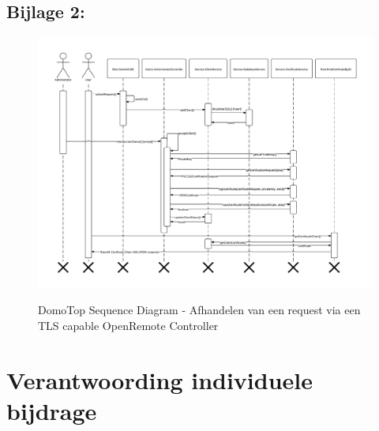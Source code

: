 \documentclass[]{article}
\begin{document}
\begin{landscape}
\subsection{Bijlage 2: }
\begin{figure}[h!]
  \centering
    \includegraphics[height=0.80\textheight,keepaspectratio]{DomoTopSequenceDiagram_without_title.pdf}
  \label{fig:tls}
  \caption{DomoTop Sequence Diagram - Afhandelen van een request via een TLS
  capable OpenRemote Controller}
\end{figure}
\end{landscape}


\newpage
\section{Verantwoording individuele bijdrage}
\end{document}
